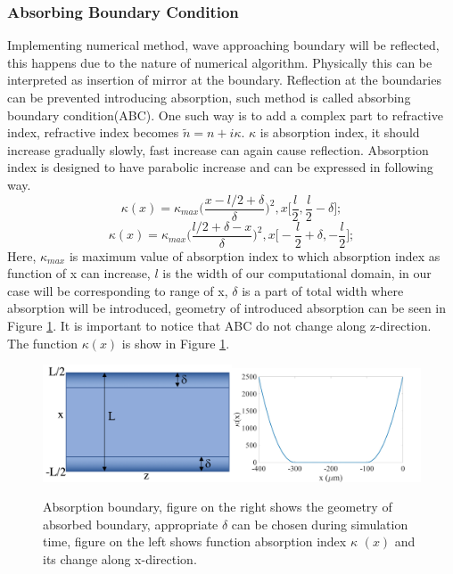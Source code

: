\documentclass[a4paper]{article}
\begin{document}
	\subsubsection{Absorbing Boundary Condition}
	Implementing numerical method, wave approaching boundary will be reflected, this happens due to the nature of numerical algorithm. Physically this can be interpreted as insertion of mirror at the boundary. Reflection at the boundaries can be prevented introducing absorption, such method is called absorbing boundary condition(ABC). One such way is to add a complex part to refractive index, refractive index becomes $\tilde{n} = n+i\kappa$. $\kappa$  is absorption index, it should increase gradually slowly, fast increase can again cause reflection. Absorption index is designed to have parabolic increase and can be expressed in following way.
	\[\kappa(x)=\kappa_{max}\bigg(\frac{x-l/2+\delta}{\delta}\bigg)^2, x\bigg[\frac{l}{2},\frac{l}{2}-\delta\bigg];\]
	\[\kappa(x)=\kappa_{max}\bigg(\frac{l/2+\delta-x}{\delta}\bigg)^2, x\bigg[-\frac{l}{2}+\delta,-\frac{l}{2}\bigg];\]
	Here, $\kappa_{max}$ is maximum value of absorption index to which absorption index as function of x can increase, $l$ is the width of our computational domain, in our case will be corresponding to range of x, $\delta$ is a part of total width where absorption will be introduced, geometry of introduced absorption can be seen in Figure \ref{fig:Absorption}. It is important to notice that ABC do not change along z-direction. The function $\kappa (x)$ is show in Figure \ref{fig:Absorption}.
	\begin{figure}[h!]
		\centering 
		\includegraphics[width=0.5\textwidth]{sketchN1.png}\includegraphics[width=0.5\textwidth]{N2.jpg}
		\caption{\label{fig:Absorption}Absorption boundary, figure on the right shows the geometry of absorbed boundary, appropriate $\delta$ can be chosen during simulation time, figure on the left shows function absorption index $\kappa$ $ (x) $ and its change along x-direction.}
	\end{figure}
\end{document}
